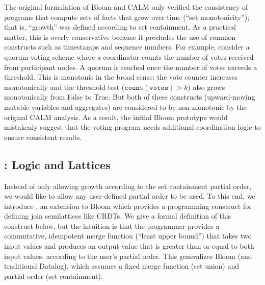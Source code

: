 The original formulation of Bloom and CALM only verified the consistency of
programs that compute sets of facts that grow over time (``set monotonicity'');
that is, ``growth'' was defined according to set containment. As a practical
matter, this is overly conservative because it precludes the use of common
constructs such as timestamps and sequence numbers. For example, consider a
quorum voting scheme where a coordinator counts the number of votes received
from participant nodes. A quorum is reached once the number of votes exceeds a
threshold. This is monotonic in the broad sense: the vote counter increases
monotonically and the threshold test ($\mathtt{count(votes)} > k$) also grows
monotonically from False to True. But both of these constructs (upward-moving
mutable variables and aggregates) are considered to be non-monotonic by the
original CALM analysis.  As a result, the initial Bloom prototype would
mistakenly suggest that the voting program needs additional coordination logic
to ensure consistent results.

\subsection{\lang: Logic and Lattices}
Instead of only allowing growth according to the set containment partial order,
we would like to allow any user-defined partial order to be used.  To this end,
we introduce \lang, an extension to Bloom which provides a programming
construct for defining join semilattices like CRDTs.  We give a formal
definition of this construct below, but the intuition is that the programmer
provides a commutative, idempotent merge function (``least upper bound'') that
takes two input values and produces an output value that is greater than or
equal to both input values, according to the user's partial order. This
generalizes Bloom (and traditional Datalog), which assumes a fixed merge
function (set union) and partial order (set containment).


